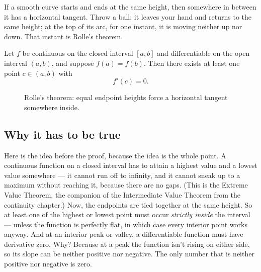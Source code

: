 \begin{intuitionbox}
If a smooth curve starts and ends at the same height, then somewhere in between it
has a horizontal tangent. Throw a ball; it leaves your hand and returns to the same
height; at the top of its arc, for one instant, it is moving neither up nor down.
That instant is Rolle's theorem.
\end{intuitionbox}

\begin{theorem}[Rolle, 1691]\label{ch15:thm-rolle}
Let $f$ be continuous on the closed interval $[a,b]$ and differentiable on the open
interval $(a,b)$, and suppose $f(a)=f(b)$. Then there exists at least one point
$c\in(a,b)$ with
\[
  f'(c)=0.
\]
\end{theorem}

\begin{figure}[H]
\centering
{}
\caption{Rolle's theorem: equal endpoint heights force a horizontal tangent
somewhere inside.}
\label{ch15:fig-rolle}
\end{figure}

\subsection{Why it has to be true}

Here is the idea before the proof, because the idea is the whole point. A
continuous function on a closed interval has to attain a highest value and a lowest
value somewhere --- it cannot run off to infinity, and it cannot sneak up to a
maximum without reaching it, because there are no gaps. (This is the Extreme Value
Theorem, the companion of the Intermediate Value Theorem from the continuity
chapter.) Now, the endpoints are tied together at the same height. So at least one
of the highest or lowest point must occur \emph{strictly inside} the interval ---
unless the function is perfectly flat, in which case every interior point works
anyway. And at an interior peak or valley, a differentiable function must have
derivative zero. Why? Because at a peak the function isn't rising on either side,
so its slope can be neither positive nor negative. The only number that is neither
positive nor negative is zero.

